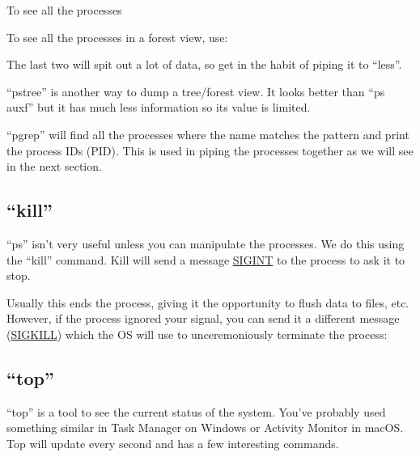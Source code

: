 \begin{prompt}
\end{prompt}

To see all the processes

\begin{prompt}
\end{prompt}

To see all the processes in a forest view, use:

\begin{prompt}
\end{prompt}

The last two will spit out a lot of data, so get in the habit of piping it to
``less''.

``pstree'' is another way to dump a tree/forest view. It looks better than ``ps
auxf'' but it has much less information so its value is limited.

``pgrep'' will find all the processes where the name matches the pattern and
print the process IDs (PID). This is used in piping the processes together as we
will see in the next section.

\subsection{``kill''}
``ps'' isn't very useful unless you can manipulate the processes. We do this
using the ``kill'' command. Kill will send a message
\href{https://en.wikipedia.org/wiki/Unix_signal#POSIX_signals}{SIGINT} to the
process to ask it to stop.

\begin{prompt}
\end{prompt}

Usually this ends the process, giving it the opportunity to flush data to files,
etc. However, if the process ignored your signal, you can send it a different
message (\href{https://www.youtube.com/watch?v=Fow7iUaKrq4}{SIGKILL}) which the OS
will use to unceremoniously terminate the process:

\begin{prompt}
\end{prompt}

\subsection{``top''}
``top'' is a tool to see the current status of the system. You've probably used
something similar in Task Manager on Windows or Activity Monitor in macOS. Top
will update every second and has a few interesting commands.


